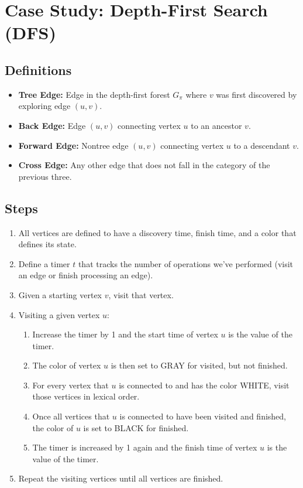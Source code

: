 \section{Case Study: Depth-First Search (DFS)}

\subsection{Definitions}
\begin{itemize}
	\item \textbf{Tree Edge: } Edge in the depth-first forest $G_\pi$ where $v$ was first discovered by exploring edge $(u,v)$.
	\item \textbf{Back Edge: } Edge $(u,v)$ connecting vertex $u$ to an ancestor $v$.
	\item \textbf{Forward Edge: } Nontree edge $(u,v)$ connecting vertex $u$ to a descendant $v$.
	\item \textbf{Cross Edge: } Any other edge that does not fall in the category of the previous three.
\end{itemize}

\subsection*{Steps}
\begin{enumerate}
	\item All vertices are defined to have a discovery time, finish time, and a color that defines its state.
	\item Define a timer $t$ that tracks the number of operations we've performed (visit an edge or finish processing an edge). 
	\item Given a starting vertex $v$, visit that vertex.
	\item Visiting a given vertex $u$:
	\begin{enumerate}
		\item Increase the timer by 1 and the start time of vertex $u$ is the value of the timer.
		\item The color of vertex $u$ is then set to GRAY for visited, but not finished.
		\item For every vertex that $u$ is connected to and has the color WHITE, visit those vertices in lexical order.
		\item Once all vertices that $u$ is connected to have been visited and finished, the color of $u$ is set to BLACK for finished.
		\item The timer is increased by 1 again and the finish time of vertex $u$ is the value of the timer.
	\end{enumerate}
	\item Repeat the visiting vertices until all vertices are finished.
\end{enumerate}


